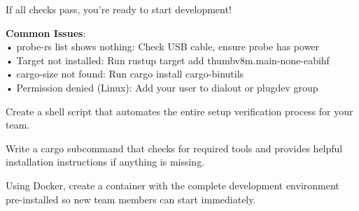 If all checks pass, you're ready to start development!

\begin{tipbox}
    \textbf{Common Issues}:
    \\• probe-rs list shows nothing: Check USB cable, ensure probe has power
    \\• Target not installed: Run rustup target add thumbv8m.main-none-eabihf
    \\• cargo-size not found: Run cargo install cargo-binutils
    \\• Permission denied (Linux): Add your user to dialout or plugdev group
\end{tipbox}

\begin{exercise}[Easy]
    Create a shell script that automates the entire setup verification process for your team.
\end{exercise}

\begin{exercise}[Medium]
    Write a cargo subcommand that checks for required tools and provides helpful installation instructions if anything is missing.
\end{exercise}

\begin{exercise}[Hard]
    Using Docker, create a container with the complete development environment pre-installed so new team members can start immediately.
\end{exercise}
\clearpage

